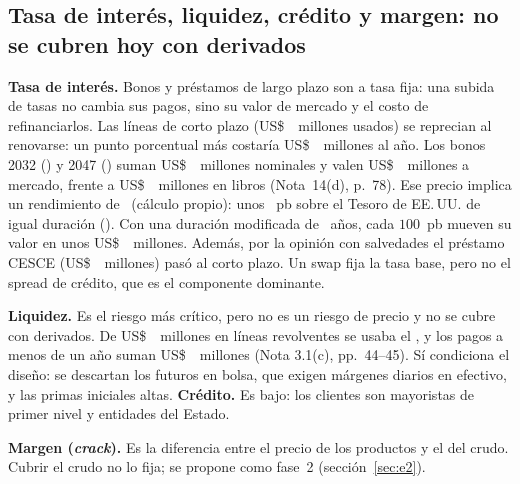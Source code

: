 \subsection{Tasa de interés, liquidez, crédito y margen: no se cubren hoy con derivados}
\textbf{Tasa de interés.} Bonos y préstamos de largo plazo son a tasa fija: una subida de tasas no cambia sus
pagos, sino su valor de mercado y el costo de refinanciarlos. Las líneas de corto plazo (US\$~\LineasUsadas\ millones
usados) se reprecian al renovarse: un punto porcentual más costaría US\$~\CostoLineasCienPb\ millones al año. Los bonos 2032 (\CuponTreintaDos) y 2047
(\CuponCuarentaSiete) suman US\$~\BonosNominal\ millones nominales y valen US\$~\BonosVR\ millones a mercado, frente a
US\$~\BonosLibros\ millones en libros (Nota~14(d), p.~78). Ese precio implica un rendimiento de \YTMBonos\ (cálculo
propio): unos \SpreadBonosPb~pb sobre el Tesoro de EE.\,UU. de igual duración (\USTDurDic). Con una duración
modificada de \BonosDurMod\ años, cada $100$~pb mueven su valor en unos US\$~\BonosDVCien\ millones. Además, por la opinión
con salvedades el préstamo CESCE (US\$~\CESCESaldo\ millones) pasó al corto plazo. Un swap fija la tasa base, pero no el spread de crédito, que es el componente dominante.

\textbf{Liquidez.} Es el riesgo más crítico, pero no es un riesgo de precio y no se cubre con derivados. De
US\$~\LineasRev\ millones en líneas revolventes se usaba el \LineasPct, y los pagos a menos de un año suman
US\$~\VencMenosUnAnio\ millones (Nota 3.1(c), pp.~44--45). Sí condiciona el diseño: se descartan los futuros en
bolsa, que exigen márgenes diarios en efectivo, y las primas iniciales altas. \textbf{Crédito.} Es bajo: los clientes
son mayoristas de primer nivel y entidades del Estado.

\textbf{Margen (\emph{crack}).} Es la diferencia entre el precio de los productos y el del crudo. Cubrir el crudo
no lo fija; se propone como fase~2 (sección~\ref{sec:e2}).
